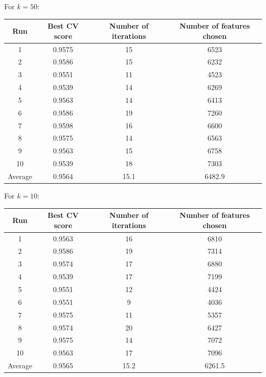 \documentclass[12pt, twoside, a4paper]{report}
\begin{document}
For $k=50$:

\begin{center}
    \begin{tabular}{| c | c | c | c | } \hline
    Run & Best CV score & Number of iterations & Number of features chosen \\ \hline \hline
    1 & 0.9575 & 15 & 6523 \\ \hline
	2 & 0.9586  & 15 & 6232 \\ \hline
	3 & 0.9551 & 11 & 4523 \\ \hline
	4 & 0.9539 & 14 & 6269 \\ \hline
	5 & 0.9563 & 14 & 6413 \\ \hline
	6 & 0.9586 & 19 & 7260 \\ \hline
	7 & 0.9598 & 16 & 6600 \\ \hline
	8 & 0.9575 & 14 & 6563 \\ \hline
	9 & 0.9563 & 15 & 6758 \\ \hline
	10 & 0.9539 & 18 & 7303 \\ \hline
	Average & 0.9564 & 15.1 & 6482.9 \\ \hline
    \end{tabular}
\end{center}


For $k=10$:

\begin{center}
    \begin{tabular}{| c | c | c | c | } \hline
    Run & Best CV score & Number of iterations & Number of features chosen \\ \hline \hline
    1 & 0.9563 & 16 & 6810 \\ \hline
	2 & 0.9586  & 19 & 7314 \\ \hline
	3 & 0.9574 & 17 & 6880 \\ \hline
	4 & 0.9539 & 17 & 7199 \\ \hline
	5 & 0.9551 & 12 & 4424 \\ \hline
	6 & 0.9551 & 9 & 4036 \\ \hline
	7 & 0.9575 & 11 & 5357 \\ \hline
	8 & 0.9574 & 20 & 6427 \\ \hline
	9 & 0.9575 & 14 & 7072 \\ \hline
	10 & 0.9563 & 17 & 7096 \\ \hline
	Average & 0.9565 & 15.2 & 6261.5 \\ \hline
    \end{tabular}
\end{center}
\end{document}
